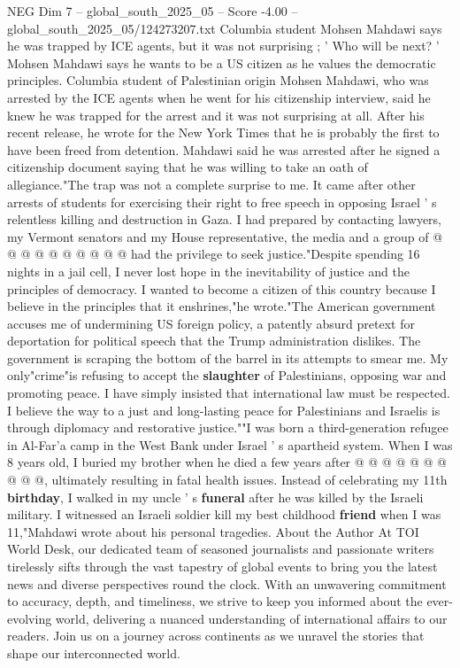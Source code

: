 \begin{textsample}{NEG Dim 7 – global\_south\_2025\_05 – Score -4.00 – global\_south\_2025\_05/124273207.txt}  \label{ex:f7_neg_220}
Columbia student Mohsen Mahdawi says he was trapped by ICE agents, but it was not surprising ; ' Who will be next? ' Mohsen Mahdawi says he wants to be a US citizen as he values the democratic principles.
Columbia student of Palestinian origin Mohsen Mahdawi, who was arrested by the ICE agents when he went for his citizenship interview, said he knew he was trapped for the arrest and it was not surprising at all.
After his recent release, he wrote for the New York Times that he is probably the first to have been freed from detention.
Mahdawi said he was arrested after he signed a citizenship document saying that he was willing to take an oath of allegiance."The trap was not a complete surprise to me.
It came after other arrests of students for exercising their right to free speech in opposing Israel ' s relentless killing and destruction in Gaza.
I had prepared by contacting lawyers, my Vermont senators and my House representative, the media and a group of @ @ @ @ @ @ @ @ @ @ had the privilege to seek justice."Despite spending 16 nights in a jail cell, I never lost hope in the inevitability of justice and the principles of democracy.
I wanted to become a citizen of this country because I believe in the principles that it enshrines,"he wrote."The American government accuses me of undermining US foreign policy, a patently absurd pretext for deportation for political speech that the Trump administration dislikes.
The government is scraping the bottom of the barrel in its attempts to smear me.
My only"crime"is refusing to accept the \textbf{slaughter} of Palestinians, opposing war and promoting peace.
I have simply insisted that international law must be respected.
I believe the way to a just and long-lasting peace for Palestinians and Israelis is through diplomacy and restorative justice.""I was born a third-generation refugee in Al-Far'a camp in the West Bank under Israel ' s apartheid system.
When I was 8 years old, I buried my brother when he died a few years after @ @ @ @ @ @ @ @ @ @, ultimately resulting in fatal health issues.
Instead of celebrating my 11th \textbf{birthday}, I walked in my uncle ' s \textbf{funeral} after he was killed by the Israeli military.
I witnessed an Israeli soldier kill my best childhood \textbf{friend} when I was 11,"Mahdawi wrote about his personal tragedies.
About the Author At TOI World Desk, our dedicated team of seasoned journalists and passionate writers tirelessly sifts through the vast tapestry of global events to bring you the latest news and diverse perspectives round the clock.
With an unwavering commitment to accuracy, depth, and timeliness, we strive to keep you informed about the ever-evolving world, delivering a nuanced understanding of international affairs to our readers.
Join us on a journey across continents as we unravel the stories that shape our interconnected world.

\end{textsample}
